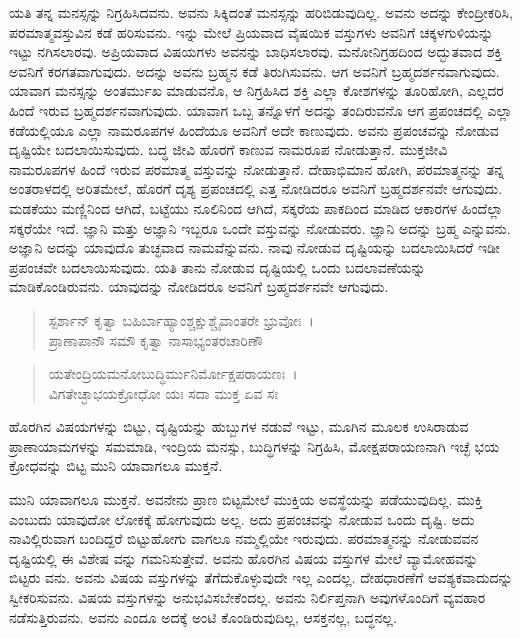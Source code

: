 ಯತಿ ತನ್ನ ಮನಸ್ಸನ್ನು ನಿಗ್ರಹಿಸಿದವನು. ಅವನು ಸಿಕ್ಕಿದಂತೆ ಮನಸ್ಸನ್ನು ಹರಿಬಿಡುವುದಿಲ್ಲ. ಅವನು ಅದನ್ನು ಕೇಂದ್ರೀಕರಿಸಿ, ಪರಮಾತ್ಮವಸ್ತುವಿನ ಕಡೆ ಹರಿಸುವನು. ಇನ್ನು ಮೇಲೆ ಪ್ರಿಯವಾದ ವೈಷಯಿಕ ವಸ್ತುಗಳು ಅವನಿಗೆ ಚಕ್ಕಳಗುಳಿಯನ್ನು ಇಟ್ಟು ನಗಿಸಲಾರವು. ಅಪ್ರಿಯವಾದ ವಿಷಯಗಳು ಅವನನ್ನು ಬಾಧಿಸಲಾರವು. ಮನೋನಿಗ್ರಹದಿಂದ ಅದ್ಭುತವಾದ ಶಕ್ತಿ ಅವನಿಗೆ ಕರಗತವಾಗುವುದು. ಅದನ್ನು ಅವನು ಬ್ರಹ್ಮನ ಕಡೆ ತಿರುಗಿಸುವನು. ಆಗ ಅವನಿಗೆ ಬ್ರಹ್ಮದರ್ಶನವಾಗುವುದು. ಯಾವಾಗ ಮನಸ್ಸನ್ನು ಅಂತರ್ಮುಖ ಮಾಡುವನೊ, ಆ ನಿಗ್ರಹಿಸಿದ ಶಕ್ತಿ ಎಲ್ಲಾ ಕೋಶಗಳನ್ನು ತೂರಿಹೋಗಿ, ಎಲ್ಲದರ ಹಿಂದೆ ಇರುವ ಬ್ರಹ್ಮದರ್ಶನವಾಗುವುದು. ಯಾವಾಗ ಒಬ್ಬ ತನ್ನೊಳಗೆ ಅದನ್ನು ತಂದಿರುವನೊ ಆಗ ಪ್ರಪಂಚದಲ್ಲಿ ಎಲ್ಲಾ ಕಡೆಯಲ್ಲಿಯೂ ಎಲ್ಲಾ ನಾಮರೂಪಗಳ ಹಿಂದೆಯೂ ಅವನಿಗೆ ಅದೇ ಕಾಣುವುದು. ಅವನು ಪ್ರಪಂಚವನ್ನು ನೋಡುವ ದೃಷ್ಟಿಯೇ ಬದಲಾಯಿಸುವುದು. ಬದ್ಧ ಜೀವಿ ಹೊರಗೆ ಕಾಣುವ ನಾಮರೂಪ ನೋಡುತ್ತಾನೆ. ಮುಕ್ತಜೀವಿ ನಾಮರೂಪಗಳ ಹಿಂದೆ ಇರುವ ಪರಮಾತ್ಮ ವಸ್ತುವನ್ನು ನೋಡುತ್ತಾನೆ. ದೇಹಾಭಿಮಾನ ಹೋಗಿ, ಪರಮಾತ್ಮನನ್ನು ತನ್ನ ಅಂತರಾಳದಲ್ಲಿ ಅರಿತಮೇಲೆ, ಹೊರಗೆ ದೃಶ್ಯ ಪ್ರಪಂಚದಲ್ಲಿ ಎತ್ತ ನೋಡಿದರೂ ಅವನಿಗೆ ಬ್ರಹ್ಮದರ್ಶನವೇ ಆಗುವುದು. ಮಡಕೆಯು ಮಣ್ಣಿನಿಂದ ಆಗಿದೆ, ಬಟ್ಟೆಯು ನೂಲಿನಿಂದ ಆಗಿದೆ, ಸಕ್ಕರೆಯ ಪಾಕದಿಂದ ಮಾಡಿದ ಆಕಾರಗಳ ಹಿಂದೆಲ್ಲಾ ಸಕ್ಕರೆಯೇ ಇದೆ. ಜ್ಞಾನಿ ಮತ್ತು ಅಜ್ಞಾನಿ ಇಬ್ಬರೂ ಒಂದೇ ವಸ್ತುವನ್ನು ನೋಡುವರು. ಜ್ಞಾನಿ ಅದನ್ನು ಬ್ರಹ್ಮ ಎನ್ನುವನು. ಅಜ್ಞಾನಿ ಅದನ್ನು ಯಾವುದೊ ತುಚ್ಛವಾದ ನಾಮವೆನ್ನುವನು. ನಾವು ನೋಡುವ ದೃಷ್ಟಿಯನ್ನು ಬದಲಾಯಿಸಿದರೆ ಇಡೀ ಪ್ರಪಂಚವೇ ಬದಲಾಯಿಸುವುದು. ಯತಿ ತಾನು ನೋಡುವ ದೃಷ್ಟಿಯಲ್ಲಿ ಒಂದು ಬದಲಾವಣೆಯನ್ನು ಮಾಡಿಕೊಂಡಿರುವನು. ಯಾವುದನ್ನು ನೋಡಿದರೂ ಅವನಿಗೆ ಬ್ರಹ್ಮದರ್ಶನವೇ ಆಗುವುದು.

\begin{verse}
ಸ್ಪರ್ಶಾನ್ ಕೃತ್ವಾ ಬಹಿರ್ಬಾಹ್ಯಾಂಶ್ಚಕ್ಷುಶ್ಚೈವಾಂತರೇ ಭ್ರುವೋಃ~।\\ಪ್ರಾಣಾಪಾನೌ ಸಮೌ ಕೃತ್ವಾ ನಾಸಾಭ್ಯಂತರಚಾರಿಣೌ 
\end{verse}

\begin{verse}
ಯತೇಂದ್ರಿಯಮನೋಬುದ್ಧಿರ್ಮುನಿರ್ಮೋಕ್ಷಪರಾಯಣಃ~।\\ವಿಗತೇಚ್ಛಾಭಯಕ್ರೋಧೋ ಯಃ ಸದಾ ಮುಕ್ತ ಏವ ಸಃ 
\end{verse}

{\small ಹೊರಗಿನ ವಿಷಯಗಳನ್ನು ಬಿಟ್ಟು, ದೃಷ್ಟಿಯನ್ನು ಹುಬ್ಬುಗಳ ನಡುವೆ ಇಟ್ಟು, ಮೂಗಿನ ಮೂಲಕ ಉಸಿರಾಡುವ ಪ್ರಾಣಾಯಾಮಗಳನ್ನು ಸಮಮಾಡಿ, ಇಂದ್ರಿಯ ಮನಸ್ಸು, ಬುದ್ಧಿಗಳನ್ನು ನಿಗ್ರಹಿಸಿ, ಮೋಕ್ಷಪರಾಯಣನಾಗಿ ಇಚ್ಛೆ ಭಯ ಕ್ರೋಧವನ್ನು ಬಿಟ್ಟ ಮುನಿ ಯಾವಾಗಲೂ ಮುಕ್ತನೆ.}

ಮುನಿ ಯಾವಾಗಲೂ ಮುಕ್ತನೆ. ಅವನೇನು ಪ್ರಾಣ ಬಿಟ್ಟಮೇಲೆ ಮುಕ್ತಿಯ ಅವಸ್ಥೆಯನ್ನು ಪಡೆಯುವುದಿಲ್ಲ. ಮುಕ್ತಿ ಎಂಬುದು ಯಾವುದೋ ಲೋಕಕ್ಕೆ ಹೋಗುವುದು ಅಲ್ಲ. ಅದು ಪ್ರಪಂಚವನ್ನು ನೋಡುವ ಒಂದು ದೃಷ್ಟಿ. ಅದು ನಾವಿಲ್ಲಿರುವಾಗ ಬಂದಿದ್ದರೆ ಬಿಟ್ಟುಹೋಗು ವಾಗಲೂ ನಮ್ಮಲ್ಲಿಯೇ ಇರುವುದು. ಪರಮಾತ್ಮನನ್ನು ನೋಡುವವನ ದೃಷ್ಟಿಯಲ್ಲಿ ಈ ವಿಶೇಷ ವನ್ನು ಗಮನಿಸುತ್ತೇವೆ. ಅವನು ಹೊರಗಿನ ವಿಷಯ ವಸ್ತುಗಳ ಮೇಲೆ ವ್ಯಾಮೋಹವನ್ನು ಬಿಟ್ಟರು ವನು. ಅವನು ವಿಷಯ ವಸ್ತುಗಳನ್ನು ತೆಗೆದುಕೊಳ್ಳುವುದೇ ಇಲ್ಲ ಎಂದಲ್ಲ. ದೇಹಧಾರಣೆಗೆ ಆವಶ್ಯಕವಾದುದನ್ನು ಸ್ವೀಕರಿಸುವನು. ವಿಷಯ ವಸ್ತುಗಳನ್ನು ಅನುಭವಿಸಬೇಕೆಂದಲ್ಲ. ಅವನು ನಿರ್ಲಿಪ್ತನಾಗಿ ಅವುಗಳೊಂದಿಗೆ ವ್ಯವಹಾರ ನಡೆಸುತ್ತಿರುವನು. ಅವನು ಎಂದೂ ಅದಕ್ಕೆ ಅಂಟಿ ಕೊಂಡಿರುವುದಿಲ್ಲ, ಆಸಕ್ತನಲ್ಲ, ಬದ್ಧನಲ್ಲ.

